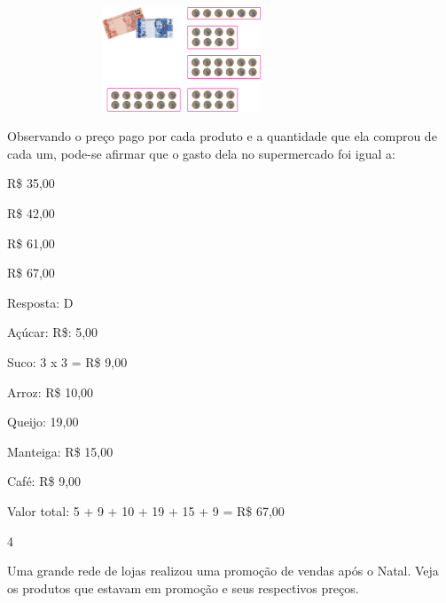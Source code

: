 \begin{escolha}
{%

\includegraphics[width=4.10036in,height=1.22511in]{media/image74.png}

Observando o preço pago por cada produto e a quantidade que ela comprou de cada um, pode-se afirmar que o gasto dela no supermercado foi igual a:

\begin{escolha}

\item
  R\$ 35,00
\item
  R\$ 42,00
\item
  R\$ 61,00
\item
  R\$ 67,00
\end{escolha}

Resposta: D

Açúcar: R\$: 5,00

Suco: 3 x 3 = R\$ 9,00

Arroz: R\$ 10,00

Queijo: 19,00

Manteiga: R\$ 15,00

Café: R\$ 9,00

Valor total: 5 + 9 + 10 + 19 + 15 + 9 = R\$ 67,00

\num{4}

Uma grande rede de lojas realizou uma promoção de vendas após o Natal.
Veja os produtos que estavam em promoção e seus respectivos preços.





}
\end{escolha}
